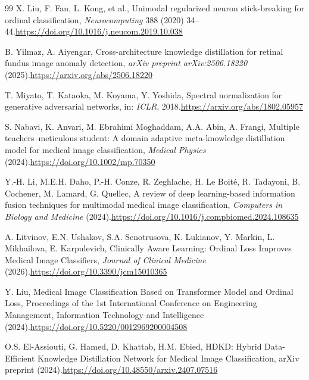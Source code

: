 \documentclass[a4paper,fleqn]{cas-dc}
\begin{document}
\begin{thebibliography}{99}
X. Liu, F. Fan, L. Kong, et al.,
Unimodal regularized neuron stick-breaking for ordinal classification,
\textit{Neurocomputing} 388 (2020) 34--44.\newline\url{https://doi.org/10.1016/j.neucom.2019.10.038}

B. Yilmaz, A. Aiyengar,
Cross-architecture knowledge distillation for retinal fundus image anomaly detection,
\textit{arXiv preprint arXiv:2506.18220} (2025).\newline\url{https://arxiv.org/abs/2506.18220}

T. Miyato, T. Kataoka, M. Koyama, Y. Yoshida,
Spectral normalization for generative adversarial networks,
in: \textit{ICLR}, 2018.\newline\url{https://arxiv.org/abs/1802.05957}

S. Nabavi, K. Anvari, M. Ebrahimi Moghaddam, A.A. Abin, A. Frangi,
Multiple teachers–meticulous student: A domain adaptive meta-knowledge distillation model for medical image classification,
\textit{Medical Physics} (2024).\newline\url{https://doi.org/10.1002/mp.70350}

Y.-H. Li, M.E.H. Daho, P.-H. Conze, R. Zeghlache, H. Le Boit\'e, R. Tadayoni, B. Cochener, M. Lamard, G. Quellec,
A review of deep learning-based information fusion techniques for multimodal medical image classification,
\textit{Computers in Biology and Medicine} (2024).\newline\url{https://doi.org/10.1016/j.compbiomed.2024.108635}

A. Litvinov, E.N. Ushakov, S.A. Senotrusova, K. Lukianov, Y. Markin, L. Mikhailova, E. Karpulevich,
Clinically Aware Learning: Ordinal Loss Improves Medical Image Classifiers,
\textit{Journal of Clinical Medicine} (2026).\newline\url{https://doi.org/10.3390/jcm15010365}

Y. Liu,
Medical Image Classification Based on Transformer Model and Ordinal Loss,
Proceedings of the 1st International Conference on Engineering Management, Information Technology and Intelligence (2024).\newline\url{https://doi.org/10.5220/0012969200004508}

O.S. El-Assiouti, G. Hamed, D. Khattab, H.M. Ebied,
HDKD: Hybrid Data-Efficient Knowledge Distillation Network for Medical Image Classification,
arXiv preprint (2024).\newline\url{https://doi.org/10.48550/arxiv.2407.07516}


\end{thebibliography}
\end{document}
